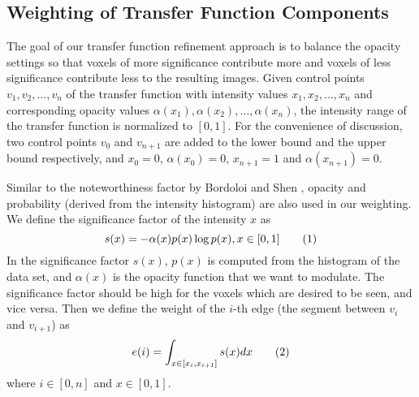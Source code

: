 \subsection{Weighting of Transfer Function Components \label{weighting_of_transfer_function_components}}
The goal of our transfer function refinement approach is to balance the opacity settings so that voxels of more significance contribute more and voxels of less significance contribute less to the resulting images.
Given control points $ v_{1},v_{2},...,v_{n} $ of the transfer function with intensity values $ x_{1},x_{2},...,x_{n} $ and corresponding opacity values $ \alpha(x_{1}),\alpha(x_{2}),...,\alpha(x_{n}) $, the intensity range of the transfer function is normalized to $ [0,1] $.
For the convenience of discussion, two control points $ v_{0} $ and $ v_{n+1} $ are added to the lower bound and the upper bound respectively, and $ x_{0}=0 $, $ \alpha(x_{0})=0 $, $ x_{n+1}=1 $ and $ \alpha(x_{n+1})=0 $.


Similar to the noteworthiness factor by Bordoloi and Shen \cite{bordoloi_view_2005}, opacity and probability (derived from the intensity histogram) are also used in our weighting.
We define the significance factor of the intensity $ x $ as
\[
s(x)=-\alpha(x)p(x) \log p(x), x \in [0,1]
\addtag \]
In the significance factor $ s(x)$, $ p(x) $ is computed from the histogram of the data set, and $ \alpha(x) $ is the opacity function that we want to modulate.
The significance factor should be high for the voxels which are desired to be seen, and vice versa.
Then we define the weight of the $ i $-th edge (the segment between $ v_{i} $ and $ v_{i+1} $) as
\[
e(i)=\int_{x \in [x_{i}, x_{i+1}]} s(x) dx
\addtag \]
where $ i \in [0,n]$ and $ x \in [0,1] $.

